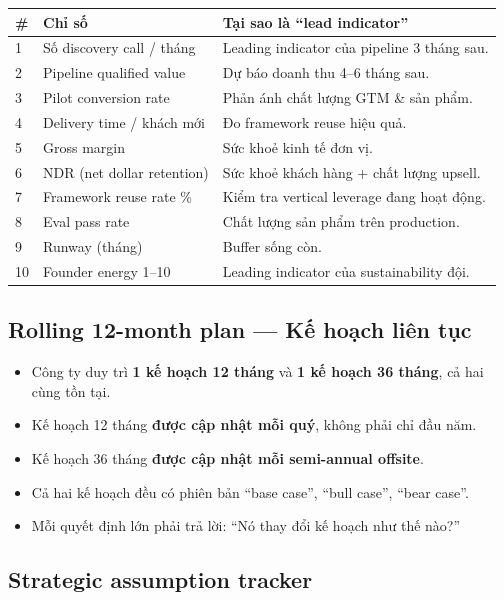 \documentclass[11pt,a4paper]{article}
\begin{document}
\begin{tabularx}{\linewidth}{@{}p{0.5cm} p{4.5cm} X@{}}
\toprule
\textbf{\#} & \textbf{Chỉ số} & \textbf{Tại sao là ``lead indicator''} \\
\midrule
1 & Số discovery call / tháng & Leading indicator của pipeline 3 tháng sau. \\
2 & Pipeline qualified value & Dự báo doanh thu 4--6 tháng sau. \\
3 & Pilot conversion rate & Phản ánh chất lượng GTM \& sản phẩm. \\
4 & Delivery time / khách mới & Đo framework reuse hiệu quả. \\
5 & Gross margin & Sức khoẻ kinh tế đơn vị. \\
6 & NDR (net dollar retention) & Sức khoẻ khách hàng + chất lượng upsell. \\
7 & Framework reuse rate \% & Kiểm tra vertical leverage đang hoạt động. \\
8 & Eval pass rate & Chất lượng sản phẩm trên production. \\
9 & Runway (tháng) & Buffer sống còn. \\
10 & Founder energy 1--10 & Leading indicator của sustainability đội. \\
\bottomrule
\end{tabularx}

\subsection{Rolling 12-month plan --- Kế hoạch liên tục}

\begin{itemize}
\item Công ty duy trì \textbf{1 kế hoạch 12 tháng} và \textbf{1 kế hoạch 36 tháng}, cả hai cùng tồn tại.
\item Kế hoạch 12 tháng \textbf{được cập nhật mỗi quý}, không phải chỉ đầu năm.
\item Kế hoạch 36 tháng \textbf{được cập nhật mỗi semi-annual offsite}.
\item Cả hai kế hoạch đều có phiên bản ``base case'', ``bull case'', ``bear case''.
\item Mỗi quyết định lớn phải trả lời: ``Nó thay đổi kế hoạch như thế nào?''
\end{itemize}

\subsection{Strategic assumption tracker}
\end{document}
